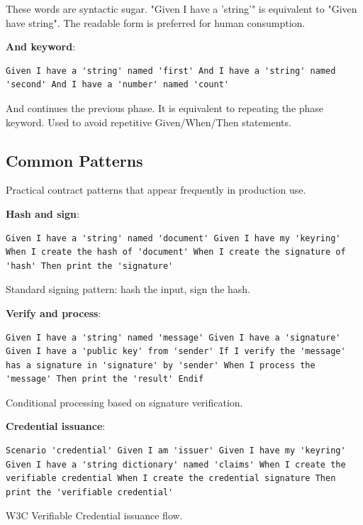 These words are syntactic sugar. "Given I have a 'string'" is
equivalent to "Given have string". The readable form is preferred for
human consumption.

\textbf{And keyword}:

\begin{verbatim}
Given I have a 'string' named 'first' And I have a 'string' named
'second' And I have a 'number' named 'count'
\end{verbatim}

And continues the previous phase. It is equivalent to repeating the
phase keyword. Used to avoid repetitive Given/When/Then statements.

\subsection{Common Patterns}

Practical contract patterns that appear frequently in production use.

\textbf{Hash and sign}:

\begin{verbatim}
Given I have a 'string' named 'document' Given I have my 'keyring'
When I create the hash of 'document' When I create the signature of
'hash' Then print the 'signature'
\end{verbatim}

Standard signing pattern: hash the input, sign the hash.

\textbf{Verify and process}:

\begin{verbatim}
Given I have a 'string' named 'message' Given I have a 'signature'
Given I have a 'public key' from 'sender' If I verify the 'message'
has a signature in 'signature' by 'sender' When I process the
'message' Then print the 'result' Endif
\end{verbatim}

Conditional processing based on signature verification.

\textbf{Credential issuance}:

\begin{verbatim}
Scenario 'credential' Given I am 'issuer' Given I have my 'keyring'
Given I have a 'string dictionary' named 'claims' When I create the
verifiable credential When I create the credential signature Then
print the 'verifiable credential'
\end{verbatim}

W3C Verifiable Credential issuance flow.

